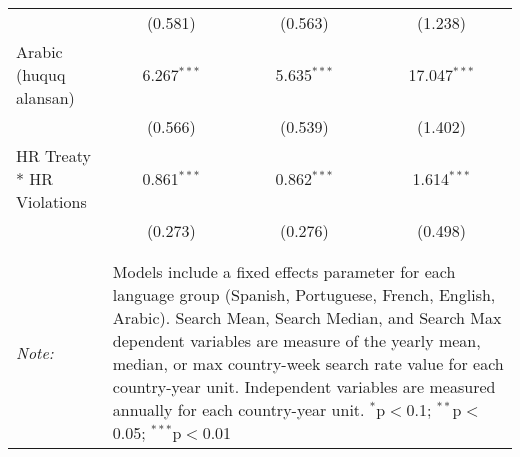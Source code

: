 \begin{table}[!htbp]
\begin{tabular}{@{\extracolsep{5pt}}lccc}
  & (0.581) & (0.563) & (1.238) \\ 
  Arabic (huquq alansan) & 6.267$^{***}$ & 5.635$^{***}$ & 17.047$^{***}$ \\ 
  & (0.566) & (0.539) & (1.402) \\ 
  HR Treaty * HR Violations & 0.861$^{***}$ & 0.862$^{***}$ & 1.614$^{***}$ \\ 
  & (0.273) & (0.276) & (0.498) \\ 
 \hline \\[-1.8ex] 
\hline 
\hline \\[-1.8ex] 
\textit{Note:}  & \multicolumn{3}{l}{\parbox[t]{8cm}{Models include a fixed effects parameter for each language group (Spanish, Portuguese, French, English, Arabic). Search Mean, Search Median, and Search Max dependent variables are measure of the yearly mean, median, or max country-week search rate value for each country-year unit. Independent variables are measured annually for each country-year unit. $^{*}$p$<$0.1; $^{**}$p$<$0.05; $^{***}$p$<$0.01}} \\ 
\end{tabular} 
\end{table} 
